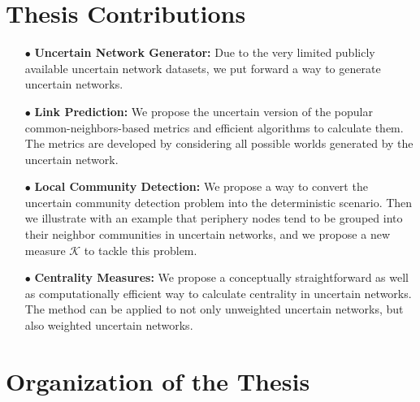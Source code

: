 \documentclass[\main/thesis.tex]{subfiles}
\begin{document}
\section{Thesis Contributions}

\begin{enumerate}
\item[$\bullet$] \textbf{Uncertain Network Generator:}  Due to the very limited publicly available uncertain network datasets, we put forward a way to generate uncertain networks.
\item[$\bullet$] \textbf{Link Prediction:}  We propose the uncertain version of the popular common-neighbors-based metrics and efficient algorithms to calculate them. The metrics are developed by considering all possible worlds generated by the uncertain network.
\item[$\bullet$] \textbf{Local Community Detection:} We propose a way to convert the uncertain community detection problem into the deterministic scenario. Then we illustrate with an example that periphery nodes tend to be grouped into their neighbor communities in uncertain networks, and we propose a new measure $\mathcal{K}$ to tackle this problem.
\item[$\bullet$] \textbf{Centrality Measures:}  We propose a conceptually straightforward as well as computationally efficient way to calculate centrality in uncertain networks. The method can be applied to not only unweighted uncertain networks, but also weighted uncertain networks.

\end{enumerate}

\section{Organization of the Thesis}






\end{document}
